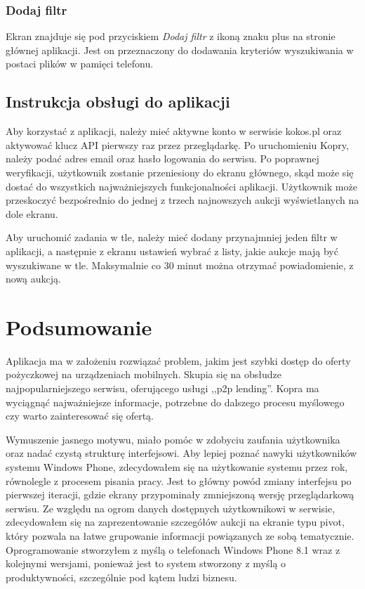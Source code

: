 \documentclass[a4paper,twoside,titlepage,openright]{book}
\begin{document}
\subsection{Dodaj filtr}
Ekran znajduje się pod przyciskiem \textit{Dodaj filtr} z ikoną znaku plus na stronie głównej aplikacji. Jest on przeznaczony do dodawania kryteriów wyszukiwania w postaci plików w pamięci telefonu.

\section{Instrukcja obsługi do aplikacji}

Aby korzystać z aplikacji, należy mieć aktywne konto w serwisie kokos.pl oraz aktywować klucz API pierwszy raz przez przeglądarkę. Po uruchomieniu Kopry, należy podać adres email oraz hasło logowania do serwisu. Po poprawnej weryfikacji, użytkownik zostanie przeniesiony do ekranu głównego, skąd może się dostać do wszystkich najważniejszych funkcjonalności aplikacji. Użytkownik może przeskoczyć bezpośrednio do jednej z trzech najnowszych aukcji wyświetlanych na dole ekranu.

Aby uruchomić zadania w tle, należy mieć dodany przynajmniej jeden filtr w aplikacji, a następnie z ekranu ustawień wybrać z listy, jakie aukcje mają być wyszukiwane w tle. Maksymalnie co 30 minut można otrzymać powiadomienie, z nową aukcją.
 
 

 
\chapter{Podsumowanie}
Aplikacja ma w założeniu rozwiązać problem, jakim jest szybki dostęp do oferty pożyczkowej na urządzeniach mobilnych. Skupia się na obsłudze najpopularniejszego serwisu, oferującego usługi ,,p2p lending''. Kopra ma wyciągnąć najważniejsze informacje, potrzebne do dalszego procesu myślowego czy warto zainteresować się ofertą. 

Wymuszenie jasnego motywu, miało pomóc w zdobyciu zaufania użytkownika oraz nadać czystą strukturę interfejsowi. Aby lepiej poznać nawyki użytkowników systemu Windows Phone, zdecydowałem się na użytkowanie systemu przez rok, równolegle z procesem pisania pracy. Jest to główny powód zmiany interfejsu po pierwszej iteracji, gdzie ekrany przypominały zmniejszoną wersję przeglądarkową serwisu. Ze względu na ogrom danych dostępnych użytkownikowi w serwisie, zdecydowałem się na zaprezentowanie szczegółów aukcji na ekranie typu pivot, który pozwala na łatwe grupowanie informacji powiązanych ze sobą tematycznie. 
Oprogramowanie stworzyłem z myślą o telefonach Windows Phone 8.1 wraz z kolejnymi wersjami, ponieważ jest to system stworzony z myślą o produktywności, szczególnie pod kątem ludzi biznesu. 
\end{document}
